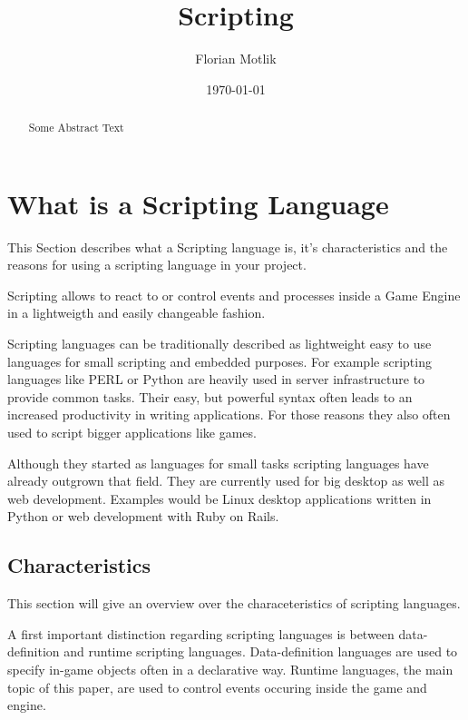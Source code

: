 \documentclass{article}
\begin{document}
\author{Florian Motlik}
\title{Scripting}
\date{\today}
\maketitle

\tableofcontents
\newpage

\begin{abstract}
Some Abstract Text
\end{abstract}

\section{What is a Scripting Language}
This Section describes what a Scripting language is, it's characteristics and
the reasons for using a scripting language in your project.

Scripting allows to react to or control events and processes inside a 
Game Engine in a lightweigth and easily changeable fashion.

Scripting languages can be traditionally described as lightweight easy to use
languages for small scripting and embedded purposes. For example scripting
languages like PERL or Python are heavily used in server infrastructure to
provide common tasks. Their easy, but powerful syntax often leads to an increased
productivity in writing applications. For those reasons they also often used to
script bigger applications like games.

Although they started as languages for small tasks scripting languages have
already outgrown that field. They are currently used for big desktop as well
as web development. Examples would be Linux desktop applications written in
Python or web development with Ruby on Rails.
\subsection{Characteristics} \label{sec-characteristics}
This section will give an overview over the characeteristics of scripting
languages.

A first important distinction regarding scripting languages is between
data-definition and runtime scripting languages. Data-definition languages are
used to specify in-game objects often in a declarative way. Runtime languages,
the main topic of this paper, are used to control events occuring inside the
game and engine.
\end{document}
